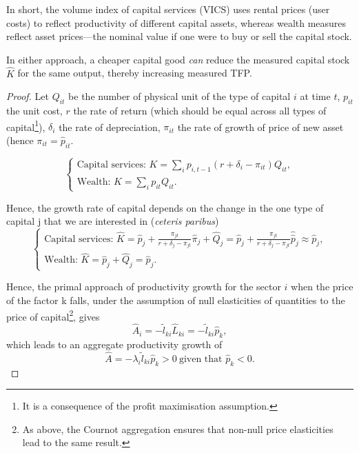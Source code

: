 \documentclass[11pt]{article}
\begin{document}
In short, the volume index of capital services (VICS) uses rental prices (user costs) to reflect productivity of different capital assets, whereas wealth measures reflect asset prices—the nominal value if one were to buy or sell the capital stock.

In either approach, a cheaper capital good \emph{can} reduce the measured capital stock 
$\hat{K}$ for the same output, thereby increasing measured TFP. 

\begin{proof}
    
 Let $Q_{it}$ be the number of physical unit of the type of capital $i$ at time $t$, $p_{it}$ the unit cost, $r$ the rate of return (which should be equal across all types of capital\footnote{It is a consequence of the profit maximisation assumption.}), $\delta_i$ the rate of depreciation, $\pi_{it}$ the rate of growth of price of new asset (hence $\pi_{it}=\hat{p}_{it}$. 

\begin{equation}
    \begin{cases}
        \text{Capital services: } K= \sum_{i} p_{i,t-1}(r+\delta_i -\pi_{it})Q_{it},\\
        \text{Wealth: } K= \sum_{i} p_{it}Q_{it}.
    \end{cases}
\end{equation}

Hence, the growth rate of capital depends on the change in the one type of capital j that we are interested in (\textit{ceteris paribus})
\begin{equation}
    \begin{cases}
        \text{Capital services: } \hat{K}=  \hat{p}_{j} +\frac{\pi_{jt}}{r+\delta_j -\pi_{jt}}\hat{\pi}_j +\hat{Q}_{j}=\hat{p}_{j} +\frac{\pi_{jt}}{r+\delta_j -\pi_{jt}}\hat{\hat{p}}_j\approx\hat{p}_{j}  ,\\
        \text{Wealth: } \hat{K}= \hat{p}_{j}+\hat{Q}_{j}=\hat{p}_{j}.
    \end{cases}
\end{equation}

Hence, the primal approach of productivity growth for the sector $i$ when the price of the factor k falls, under the assumption of null elasticities of quantities to the price of capital\footnote{As above, the Cournot aggregation ensures that non-null price elasticities lead to the same result.}, gives 
\begin{equation}
    \hat{A}_i=-\tilde{l}_{ki}\hat{L}_{ki}=-\tilde{l}_{ki}\hat{p}_{k},
\end{equation}
which leads to an aggregate productivity growth of 
\begin{equation}
    \hat{A}=-\lambda_i\tilde{l}_{ki}\hat{p}_{k}>0~\text{given that }\hat{p}_k<0.
\end{equation}

\end{proof}
\end{document}
